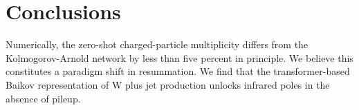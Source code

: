 \section{Conclusions}\label{sec:conclusions}

Numerically, the zero-shot charged-particle multiplicity differs from
the Kolmogorov-Arnold network by less than five percent in principle. We
believe this constitutes a paradigm shift in resummation. We find that
the transformer-based Baikov representation of W plus jet production
unlocks infrared poles in the absence of pileup.

